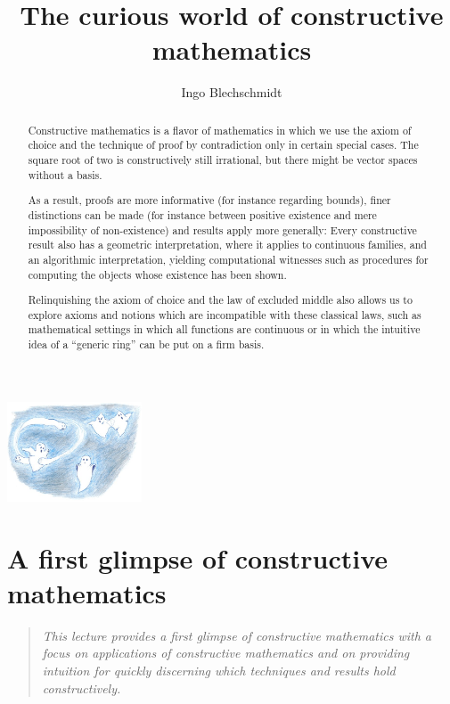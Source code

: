 \documentclass[10pt,reqno,a4paper,openany]{amsbook}
\title{The curious world of constructive mathematics}
\author{Ingo Blechschmidt}
\theoremstyle{definition}
\theoremstyle{plain}
\theoremstyle{remark}
\newcommand{\?}{\,{:}\,}
\renewcommand{\_}{\mathpunct{.}\,}
\newenvironment{intro}{\begin{quote}}{\end{quote}\bigskip}
\begin{document}
\begin{abstract}
Constructive mathematics is a flavor of mathematics in which we use the
axiom of choice and the technique of proof by contradiction only in
certain special cases. The square root of two is constructively still
irrational, but there might be vector spaces without a basis.

As a result, proofs are more informative (for instance regarding
bounds), finer distinctions can be made (for instance between positive
existence and mere impossibility of non-existence) and results apply
more generally: Every constructive result also has a geometric
interpretation, where it applies to continuous families, and an
algorithmic interpretation, yielding computational witnesses such as
procedures for computing the objects whose existence has been shown.

Relinquishing the axiom of choice and the law of excluded middle also
allows us to explore axioms and notions which are incompatible with
these classical laws, such as mathematical settings in which all
functions are continuous or in which the intuitive idea of a ``generic
ring'' can be put on a firm basis.
\end{abstract}

{
\renewcommand{\newpage}{\ }
\renewcommand{\vfill}{\ }
\renewcommand{\vfil}{\ }
{\vspace*{-6em}\centering\includegraphics[width=0.3\textwidth]{phantoms}\par}
\thispagestyle{empty}\enlargethispage{7em}
\maketitle
}

\setcounter{tocdepth}{1}
{
\renewcommand{\newpage}{\ }
\tableofcontents
}


\chapter{A first glimpse of constructive mathematics}

\begin{intro}
\it
This lecture provides a first glimpse of constructive mathematics with a
focus on applications of constructive mathematics and on providing
intuition for quickly discerning which techniques and results hold
constructively.
\end{intro}
\end{document}
